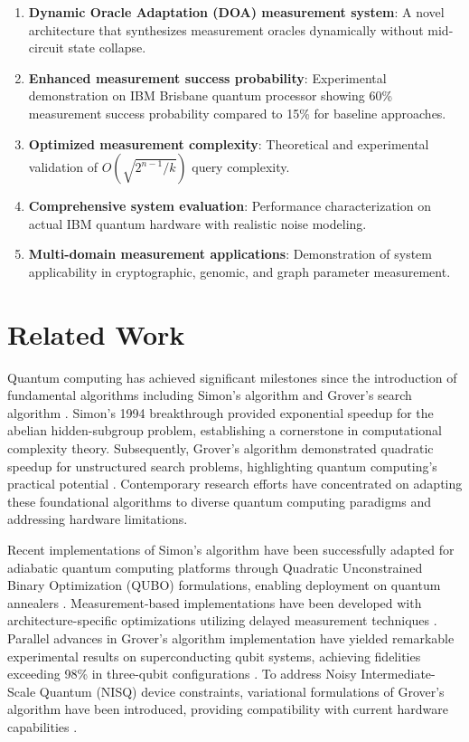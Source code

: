 \documentclass[journal]{IEEEtran}
\begin{document}
\begin{enumerate}
\item \textbf{Dynamic Oracle Adaptation (DOA) measurement system}: A novel architecture that synthesizes measurement oracles dynamically without mid-circuit state collapse.
\item {\textbf{Enhanced measurement success probability}: Experimental demonstration on IBM Brisbane quantum processor showing 60\% measurement success probability compared to 15\% for baseline approaches.}
\item {\textbf{Optimized measurement complexity}: Theoretical and experimental validation of $O(\sqrt{2^{n-1}/k})$ query complexity.}
\item {\textbf{Comprehensive system evaluation}: Performance characterization on actual IBM quantum hardware with realistic noise modeling.}
\item \textbf{Multi-domain measurement applications}: Demonstration of system applicability in cryptographic, genomic, and graph parameter measurement.
\end{enumerate}

\section{Related Work}

Quantum computing has achieved significant milestones since the introduction of fundamental algorithms including Simon's algorithm \cite{365701} and Grover's search algorithm \cite{grover1996fastquantummechanicalalgorithm}. Simon's 1994 breakthrough provided exponential speedup for the abelian hidden-subgroup problem, establishing a cornerstone in computational complexity theory. Subsequently, Grover's algorithm demonstrated quadratic speedup for unstructured search problems, highlighting quantum computing's practical potential \cite{365701}. Contemporary research efforts have concentrated on adapting these foundational algorithms to diverse quantum computing paradigms and addressing hardware limitations.

Recent implementations of Simon's algorithm have been successfully adapted for adiabatic quantum computing platforms through Quadratic Unconstrained Binary Optimization (QUBO) formulations, enabling deployment on quantum annealers \cite{robertson2024simonsalgorithmnisqcloud}. Measurement-based implementations have been developed with architecture-specific optimizations utilizing delayed measurement techniques \cite{schwetz2024simonalgorithmmeasurementbasedquantum}. Parallel advances in Grover's algorithm implementation have yielded remarkable experimental results on superconducting qubit systems, achieving fidelities exceeding 98\% in three-qubit configurations \cite{AbuGhanem:2024vwb}. To address Noisy Intermediate-Scale Quantum (NISQ) device constraints, variational formulations of Grover's algorithm have been introduced, providing compatibility with current hardware capabilities \cite{ablayev2023hybridclassicalquantumtextsearch, 10848114}.
\end{document}
